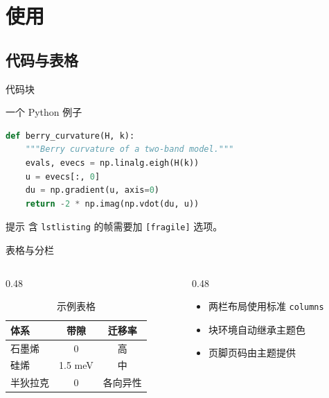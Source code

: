 \documentclass[aspectratio=169]{beamer}
\begin{document}
\section{使用}
\subsection{代码与表格}

\begin{frame}[fragile]{代码块}
    \begin{block}{一个 Python 例子}
        \begin{lstlisting}[language=Python]
def berry_curvature(H, k):
    """Berry curvature of a two-band model."""
    evals, evecs = np.linalg.eigh(H(k))
    u = evecs[:, 0]
    du = np.gradient(u, axis=0)
    return -2 * np.imag(np.vdot(du, u))
        \end{lstlisting}
    \end{block}
    \begin{exampleblock}{提示}
        含 \verb|lstlisting| 的帧需要加 \verb|[fragile]| 选项。
    \end{exampleblock}
\end{frame}

\begin{frame}[fragile]{表格与分栏}
    \begin{columns}[T]
        \begin{column}{0.48\textwidth}
            \begin{table}
                \centering
                \begin{tabular}{lcc}
                    \hline
                    体系 & 带隙 & 迁移率 \\
                    \hline
                    石墨烯 & 0 & 高 \\
                    硅烯 & 1.5 meV & 中 \\
                    半狄拉克 & 0 & 各向异性 \\
                    \hline
                \end{tabular}
                \caption{示例表格}
            \end{table}
        \end{column}
        \begin{column}{0.48\textwidth}
            \begin{itemize}
                \item 两栏布局使用标准 \verb|columns|
                \item 块环境自动继承主题色
                \item 页脚页码由主题提供
            \end{itemize}
        \end{column}
    \end{columns}
\end{frame}

\QApage
\end{document}
